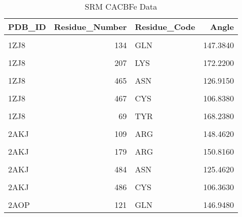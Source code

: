 	\begin{table}
		\caption{SRM CACBFe Data}
		\label{tbl:SRM_cab}
		\centering
		\begin{tabular}{lrlr}
			\toprule
			PDB\_ID & Residue\_Number & Residue\_Code & Angle\\
			\midrule
			\cellcolor{gray!6}{1ZJ8} & \cellcolor{gray!6}{129} & \cellcolor{gray!6}{ASP} & \cellcolor{gray!6}{96.5485}\\
			1ZJ8 & 134 & GLN & 147.3840\\
			\cellcolor{gray!6}{1ZJ8} & \cellcolor{gray!6}{166} & \cellcolor{gray!6}{ARG} & \cellcolor{gray!6}{157.1260}\\
			1ZJ8 & 207 & LYS & 172.2200\\
			\cellcolor{gray!6}{1ZJ8} & \cellcolor{gray!6}{209} & \cellcolor{gray!6}{LYS} & \cellcolor{gray!6}{132.2160}\\
			\addlinespace
			1ZJ8 & 465 & ASN & 126.9150\\
			\cellcolor{gray!6}{1ZJ8} & \cellcolor{gray!6}{466} & \cellcolor{gray!6}{SER} & \cellcolor{gray!6}{46.1914}\\
			1ZJ8 & 467 & CYS & 106.8380\\
			\cellcolor{gray!6}{1ZJ8} & \cellcolor{gray!6}{468} & \cellcolor{gray!6}{ALA} & \cellcolor{gray!6}{54.3434}\\
			1ZJ8 & 69 & TYR & 168.2380\\
			\addlinespace
			\cellcolor{gray!6}{1ZJ8} & \cellcolor{gray!6}{97} & \cellcolor{gray!6}{ARG} & \cellcolor{gray!6}{148.8370}\\
			2AKJ & 109 & ARG & 148.4620\\
			\cellcolor{gray!6}{2AKJ} & \cellcolor{gray!6}{142} & \cellcolor{gray!6}{THR} & \cellcolor{gray!6}{112.5850}\\
			2AKJ & 179 & ARG & 150.8160\\
			\cellcolor{gray!6}{2AKJ} & \cellcolor{gray!6}{224} & \cellcolor{gray!6}{LYS} & \cellcolor{gray!6}{179.3020}\\
			\addlinespace
			2AKJ & 484 & ASN & 125.4620\\
			\cellcolor{gray!6}{2AKJ} & \cellcolor{gray!6}{485} & \cellcolor{gray!6}{SER} & \cellcolor{gray!6}{45.1203}\\
			2AKJ & 486 & CYS & 106.3630\\
			\cellcolor{gray!6}{2AOP} & \cellcolor{gray!6}{116} & \cellcolor{gray!6}{ASN} & \cellcolor{gray!6}{95.1407}\\
			2AOP & 121 & GLN & 146.9480\\

\end{tabular}
\end{table}
